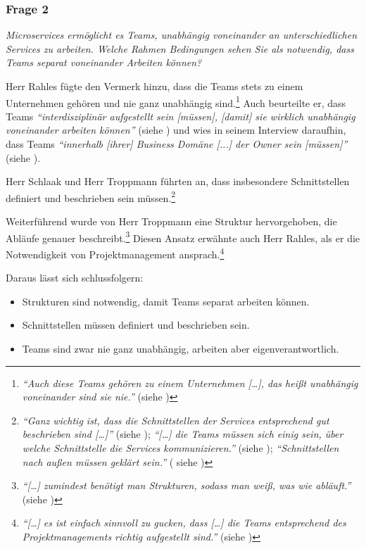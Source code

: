\subsubsection{Frage 2}
\label{sec:frage2}

\textit{Microservices ermöglicht es Teams, unabhängig voneinander an unterschiedlichen Services zu arbeiten. Welche Rahmen Bedingungen sehen Sie als notwendig, dass Teams separat voneinander Arbeiten können?}

Herr Rahles fügte den Vermerk hinzu, dass die Teams stets zu einem Unternehmen gehören und nie ganz unabhängig sind.\footnote{
\textit{\enquote{Auch diese Teams gehören zu einem Unternehmen […], das heißt unabhängig voneinander sind sie nie.}} (siehe )
}
Auch beurteilte er, dass Teams \textit{\enquote{interdisziplinär aufgestellt sein [müssen], [damit] sie wirklich unabhängig voneinander arbeiten können}} (siehe ) und wies in seinem Interview daraufhin, dass Teams \textit{\enquote{innerhalb [ihrer] Business Domäne [...] der Owner sein [müssen]}} (siehe ).

Herr Schlaak und Herr Troppmann führten an, dass insbesondere Schnittstellen definiert und beschrieben sein müssen.\footnote{
\textit{\enquote{Ganz wichtig ist, dass die Schnittstellen der Services entsprechend gut beschrieben sind […]}} (siehe ); \textit{\enquote{[…] die Teams müssen sich einig sein, über welche Schnittstelle die Services kommunizieren.}} (siehe ); \textit{\enquote{Schnittstellen nach außen müssen geklärt sein.}} ( siehe )
}

Weiterführend wurde von Herr Troppmann eine Struktur hervorgehoben, die Abläufe genauer beschreibt.\footnote{
\textit{\enquote{[…] zumindest benötigt man Strukturen, sodass man weiß, was wie abläuft.}} (siehe )
} Diesen Ansatz erwähnte auch Herr Rahles, als er die Notwendigkeit von Projektmanagement ansprach.\footnote{
\textit{\enquote{[…] es ist einfach sinnvoll zu gucken, dass […] die Teams entsprechend des Projektmanagements richtig aufgestellt sind.}} (siehe )
}

\label{sec:eigenverantwortlich} \label{sec:schnittstelle}
Daraus lässt sich schlussfolgern:
\begin{itemize}
	\item  Strukturen sind notwendig, damit Teams separat arbeiten können.
	\item Schnittstellen müssen definiert und beschrieben sein.
	\item Teams sind zwar nie ganz unabhängig, arbeiten aber eigenverantwortlich.
\end{itemize}

